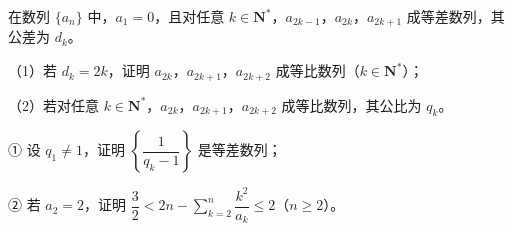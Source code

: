 \begin{question}
在数列 $\{a_n\}$ 中，$a_1=0$，且对任意 $k\in\mathbf N^*$，$a_{2k-1}$，$a_{2k}$，$a_{2k+1}$ 成等差数列，其公差为 $d_k$。

（1）若 $d_k=2k$，证明 $a_{2k}$，$a_{2k+1}$，$a_{2k+2}$ 成等比数列（$k\in\mathbf N^*$）；

（2）若对任意 $k\in\mathbf N^*$，$a_{2k}$，$a_{2k+1}$，$a_{2k+2}$ 成等比数列，其公比为 $q_k$。

① 设 $q_1\neq1$，证明 $\left\{\dfrac1{q_k-1}\right\}$ 是等差数列；

② 若 $a_2=2$，证明 $\dfrac32<2n-\sum\limits_{k=2}^n\dfrac{k^2}{a_k}\leqslant2$（$n\geqslant2$）。

\end{question}
